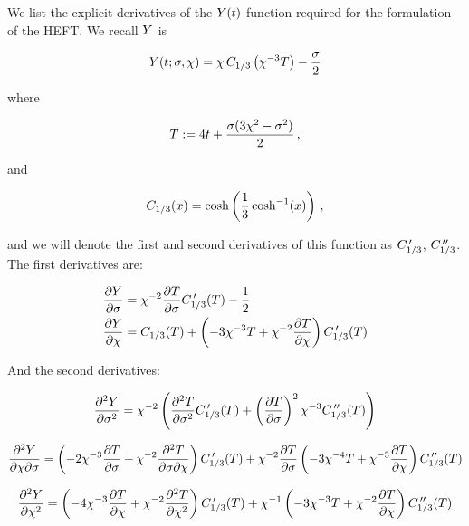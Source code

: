 We list the explicit derivatives of the $Y(t)$ function required for the formulation of the HEFT. We recall $Y$ is

\begin{equation}
	Y(t;\sigma,\chi) = \chi \, C_{1/3} \left( \chi^{-3} T \right) - \frac{\sigma}{2}
	\label{}
\end{equation}

where 

\begin{equation}
	T := 4t + \frac{\sigma(3\chi^2-\sigma^2)}{2}\,,
\end{equation}

and

\begin{equation}
	C_{1/3}(x) = \cosh\left( \frac{1}{3} \cosh^{-1}(x) \right)\,,
\end{equation}

and we will denote the first and second derivatives of this function as $C_{1/3}^{\,\prime}$, $C_{1/3}^{\,\prime\prime}$. The first derivatives are:

\begin{align}
	\frac{\partial Y}{\partial\sigma} & = \chi^{-2} \frac{\partial T}{\partial\sigma} C_{1/3}^{\,\prime}(T) - \frac{1}{2}\\
	\frac{\partial Y}{\partial\chi} & = C_{1/3}(T) + \left(-3 \chi^{-3} T + \chi^{-2} \frac{\partial T}{\partial\chi}\right) C_{1/3}^{\,\prime}(T)
\end{align}

And the second derivatives:

\begin{equation}
	\frac{\partial^2 Y}{\partial \sigma^2} = \chi^{-2} \left( \frac{\partial^2 T}{\partial \sigma^2} C_{1/3}^{\,\prime}(T) + \left( \frac{\partial T}{\partial\sigma} \right)^2 \chi^{-3} C_{1/3}^{\,\prime\prime}(T) \right)
	\label{}
\end{equation}

\begin{equation}
	\frac{\partial^2 Y}{\partial \chi \partial \sigma} = \left(-2\chi^{-3} \frac{\partial T}{\partial\sigma}  + \chi^{-2} \frac{\partial^2 T}{\partial \sigma \partial \chi} \right) C_{1/3}^{\,\prime}(T) + \chi^{-2} \frac{\partial T}{\partial\sigma} \left( -3\chi^{-4} T + \chi^{-3} \frac{\partial T}{\partial\chi} \right)C_{1/3}^{\,\prime\prime}(T)
	\label{}
\end{equation}


\begin{equation}
	\frac{\partial^2 Y}{\partial \chi^2} = 
	\left( -4\chi^{-3} \frac{\partial T}{\partial\chi}  + \chi^{-2}\frac{\partial^2 T}{\partial \chi^2}\right)C_{1/3}^{\,\prime}(T)  + \chi^{-1} \left( -3\chi^{-3} T + \chi^{-2} \frac{\partial T}{\partial\chi} \right)C_{1/3}^{\,\prime\prime}(T)
	\label{}
\end{equation}

